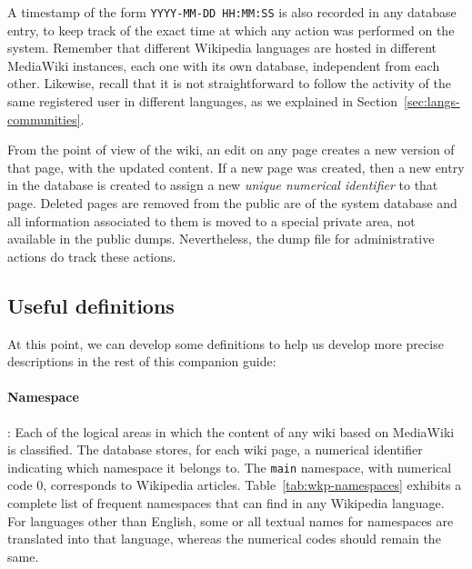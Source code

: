 A timestamp of the form \texttt{YYYY-MM-DD HH:MM:SS} is also 
recorded in any database entry, to keep track of the exact time at which any 
action was performed on the system. Remember that different Wikipedia languages
are hosted in different MediaWiki instances, each one with its own database, independent
from each other. Likewise, recall that it is not straightforward to follow the
activity of the same registered user in different languages, as we explained
in Section~\ref{sec:langs-communities}. 

From the point of view of the wiki, an edit on any page creates a new version of
that page, with the updated content. If a new page was created, then a new entry
in the database is created to assign a new \textit{unique numerical identifier} to
that page. Deleted pages are removed from the public are of the system database and
all information associated to them is moved to a special private area, not available
in the public dumps. Nevertheless, the dump file for administrative actions do track
these actions.

\subsection{Useful definitions}
\label{subsec:methodology-definitions}

At this point, we can develop some definitions to help us develop more precise
descriptions in the rest of this companion guide:

\paragraph{Namespace}: Each of the logical areas in which the content of any wiki
based on MediaWiki is classified. The database stores, for each wiki page, a numerical
identifier indicating which namespace it belongs to. The \texttt{main} namespace, with
numerical code 0, corresponds to Wikipedia articles. Table~\ref{tab:wkp-namespaces} 
exhibits a complete list of frequent namespaces that can find in any Wikipedia
language. For languages other than English, some or all textual names for namespaces
are translated into that language, whereas the numerical codes should remain the same.

